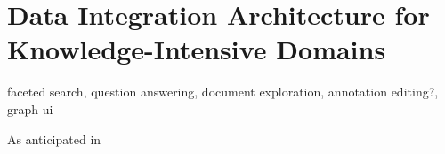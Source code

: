 \chapter{Data Integration Architecture for Knowledge-Intensive Domains}
\label{chap:architecture}

faceted search, question answering, document exploration, annotation editing?, graph ui

As anticipated in 